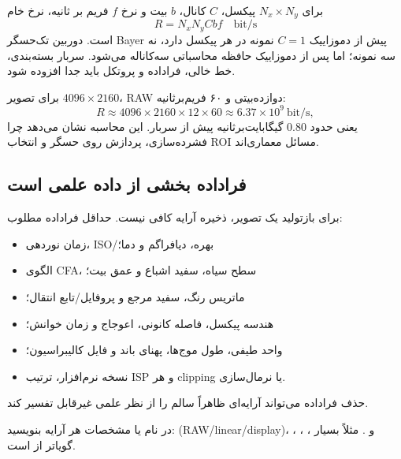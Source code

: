 برای \(N_x\times N_y\) پیکسل، \(C\) کانال، \(b\) بیت و نرخ \(f\) فریم بر ثانیه، نرخ خام
\begin{equation}
R=N_xN_yCbf\quad\text{bit/s}
\label{eq:data-rate}
\end{equation}
است. دوربین تک‌حسگر Bayer پیش از دموزاییک \(C=1\) نمونه در هر پیکسل دارد، نه سه نمونه؛ اما پس از
دموزاییک حافظه محاسباتی سه‌کاناله می‌شود. سربار بسته‌بندی، خط خالی، فراداده و پروتکل باید جدا افزوده
شود.

\begin{example}
برای تصویر \(4096\times2160\)، RAW دوازده‌بیتی و ۶۰ فریم‌برثانیه:
\begin{equation}
R\approx4096\times2160\times12\times60
\approx6.37\times10^9\ \text{bit/s},
\end{equation}
یعنی حدود \(0.80\) گیگابایت‌برثانیه پیش از سربار. این محاسبه نشان می‌دهد چرا فشرده‌سازی، پردازش
روی حسگر و انتخاب ROI مسائل معماری‌اند.
\end{example}

\subsection{فراداده بخشی از داده علمی است}

برای بازتولید یک تصویر، ذخیره آرایه کافی نیست. حداقل فراداده مطلوب:
\begin{itemize}
\item زمان نوردهی، ISO/بهره، دیافراگم و دما؛
\item الگوی CFA، سطح سیاه، سفید اشباع و عمق بیت؛
\item ماتریس رنگ، سفید مرجع و پروفایل/تابع انتقال؛
\item هندسه پیکسل، فاصله کانونی، اعوجاج و زمان خوانش؛
\item واحد طیفی، طول موج‌ها، پهنای باند و فایل کالیبراسیون؛
\item نسخه نرم‌افزار، ترتیب ISP و هر clipping یا نرمال‌سازی.
\end{itemize}
حذف فراداده می‌تواند آرایه‌ای ظاهراً سالم را از نظر علمی غیرقابل تفسیر کند.

\begin{keybox}
در نام یا مشخصات هر آرایه بنویسید:  (RAW/linear/display)، ،
، ،  و . مثلاً
 بسیار گویاتر از
 است.
\end{keybox}

